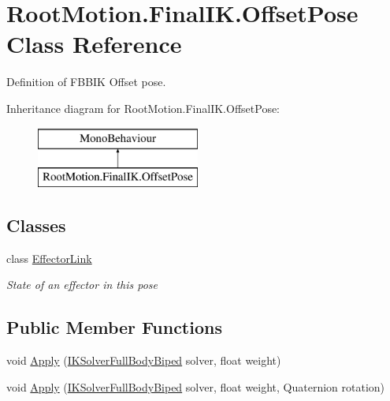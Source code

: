 \hypertarget{class_root_motion_1_1_final_i_k_1_1_offset_pose}{}\section{Root\+Motion.\+Final\+I\+K.\+Offset\+Pose Class Reference}
\label{class_root_motion_1_1_final_i_k_1_1_offset_pose}


Definition of F\+B\+B\+IK Offset pose.  


Inheritance diagram for Root\+Motion.\+Final\+I\+K.\+Offset\+Pose\+:\begin{figure}[H]
\begin{center}
\leavevmode
\includegraphics[height=2.000000cm]{class_root_motion_1_1_final_i_k_1_1_offset_pose}
\end{center}
\end{figure}
\subsection*{Classes}
\begin{DoxyCompactItemize}
\item 
class \mbox{\hyperlink{class_root_motion_1_1_final_i_k_1_1_offset_pose_1_1_effector_link}{Effector\+Link}}
\begin{DoxyCompactList}\small\item\em State of an effector in this pose \end{DoxyCompactList}\end{DoxyCompactItemize}
\subsection*{Public Member Functions}
\begin{DoxyCompactItemize}
\item 
void \mbox{\hyperlink{class_root_motion_1_1_final_i_k_1_1_offset_pose_a52dbf597d81170d268989632da4559fe}{Apply}} (\mbox{\hyperlink{class_root_motion_1_1_final_i_k_1_1_i_k_solver_full_body_biped}{I\+K\+Solver\+Full\+Body\+Biped}} solver, float weight)
\item 
void \mbox{\hyperlink{class_root_motion_1_1_final_i_k_1_1_offset_pose_a07d594579efa5d24c035c9b7f7466c4a}{Apply}} (\mbox{\hyperlink{class_root_motion_1_1_final_i_k_1_1_i_k_solver_full_body_biped}{I\+K\+Solver\+Full\+Body\+Biped}} solver, float weight, Quaternion rotation)
\end{DoxyCompactItemize}
